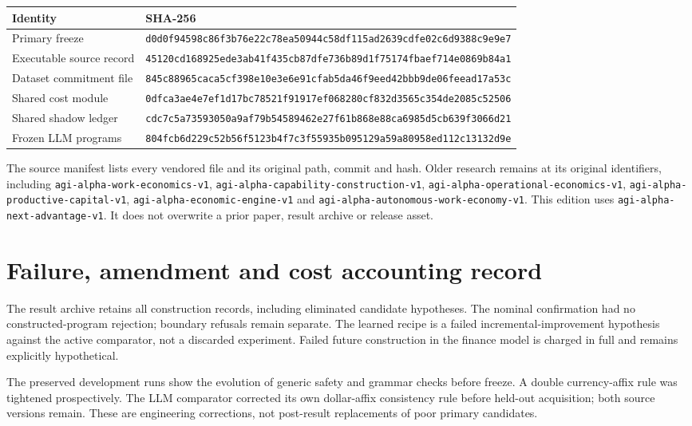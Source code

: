 \documentclass[11pt,letterpaper]{article}
\begin{document}
\begin{small}
\begin{longtable}{@{}P{.23\textwidth}P{.72\textwidth}@{}}
\toprule Identity & SHA-256\\\midrule\endhead
Primary freeze & \nolinkurl{d0d0f94598c86f3b76e22c78ea50944c58df115ad2639cdfe02c6d9388c9e9e7}\\[5pt]
Executable source record & \nolinkurl{45120cd168925ede3ab41f435cb87dfe736b89d1f75174fbaef714e0869b84a1}\\[5pt]
Dataset commitment file & \nolinkurl{845c88965caca5cf398e10e3e6e91cfab5da46f9eed42bbb9de06feead17a53c}\\[5pt]
Shared cost module & \nolinkurl{0dfca3ae4e7ef1d17bc78521f91917ef068280cf832d3565c354de2085c52506}\\[5pt]
Shared shadow ledger & \nolinkurl{cdc7c5a73593050a9af79b54589462e27f61b868e88ca6985d5cb639f3066d21}\\[5pt]
Frozen LLM programs & \nolinkurl{804fcb6d229c52b56f5123b4f7c3f55935b095129a59a80958ed112c13132d9e}\\\bottomrule
\end{longtable}
\end{small}

The source manifest lists every vendored file and its original path, commit and hash. Older research remains at its original identifiers, including \nolinkurl{agi-alpha-work-economics-v1}, \nolinkurl{agi-alpha-capability-construction-v1}, \nolinkurl{agi-alpha-operational-economics-v1}, \nolinkurl{agi-alpha-productive-capital-v1}, \nolinkurl{agi-alpha-economic-engine-v1} and \nolinkurl{agi-alpha-autonomous-work-economy-v1}. This edition uses \nolinkurl{agi-alpha-next-advantage-v1}. It does not overwrite a prior paper, result archive or release asset.

\section{Failure, amendment and cost accounting record}

The result archive retains all construction records, including eliminated candidate hypotheses. The nominal confirmation had no constructed-program rejection; boundary refusals remain separate. The learned recipe is a failed incremental-improvement hypothesis against the active comparator, not a discarded experiment. Failed future construction in the finance model is charged in full and remains explicitly hypothetical.

The preserved development runs show the evolution of generic safety and grammar checks before freeze. A double currency-affix rule was tightened prospectively. The LLM comparator corrected its own dollar-affix consistency rule before held-out acquisition; both source versions remain. These are engineering corrections, not post-result replacements of poor primary candidates.
\end{document}
